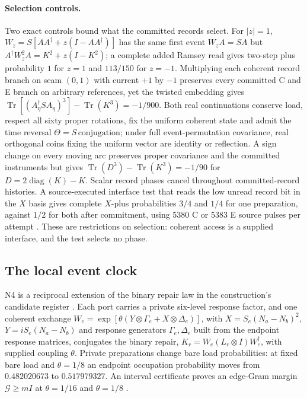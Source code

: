 \documentclass[11pt]{article}
\theoremstyle{definition}
\theoremstyle{remark}
\theoremstyle{plain}
\newcommand{\Tr}{\operatorname{Tr}}
\begin{document}
\paragraph{Selection controls.}
Two exact controls bound what the committed records select. For $|z|=1$,
$W_z=S[AA^\dagger+z(I-AA^\dagger)]$ has the same first event $W_zA=SA$ but
$A^\dagger W_z^2A=K^2+z(I-K^2)$; a complete added Ramsey read gives two-step
plus probability $1$ for $z=1$ and $113/150$ for $z=-1$. Multiplying each
coherent record branch on seam $(0,1)$ with current $+1$ by $-1$ preserves
every committed C and E branch on arbitrary references, yet the twisted
embedding gives $\Tr[(A_\eta^\dagger SA_\eta)^3]-\Tr(K^3)=-1/900$. Both real
continuations conserve load, respect all sixty proper rotations, fix the
uniform coherent state and admit the time reversal
$\Theta=S\,\mathrm{conjugation}$; under full event-permutation covariance,
real orthogonal coins fixing the uniform vector are identity or reflection.
A sign change on every moving arc preserves proper covariance and the
committed instruments but gives $\Tr(D^3)-\Tr(K^3)=-1/90$ for
$D=2\operatorname{diag}(K)-K$. Scalar record phases cancel throughout
committed-record histories. A source-executed interface test that reads the
low unread record bit in the $X$ basis gives complete $X$-plus probabilities
$3/4$ and $1/4$ for one preparation, against $1/2$ for both after commitment,
using 5380 C or 5383 E source pulses per attempt \cite{oSOURCESELECT}. These
are restrictions on selection: coherent access is a supplied interface, and
the test selects no phase.

\subsection{The local event clock}
\label{sec:local-tick}

N4 is a reciprocal extension of the binary repair law in the construction's
candidate register \cite{mCANDIDATES}. Each port carries a private six-level
response factor, and one coherent exchange
$W_e=\exp[\theta(Y\otimes\Gamma_e+X\otimes\Delta_e)]$, with
$X=S_e(N_a-N_b)^2$, $Y=iS_e(N_a-N_b)$ and response generators
$\Gamma_e,\Delta_e$ built from the endpoint response matrices, conjugates the
binary repair, $K_r=W_e(L_r\otimes I)W_e^\dagger$, with supplied coupling
$\theta$. Private preparations change bare load probabilities: at fixed bare
load and $\theta=1/8$ an endpoint occupation probability moves from
$0.482020673$ to $0.517979327$. An interval certificate proves an edge-Gram
margin $\mathcal G\ge mI$ at $\theta=1/16$ and $\theta=1/8$
\cite{mCANDIDATES,ltREADME,ophrepo}.
\end{document}
